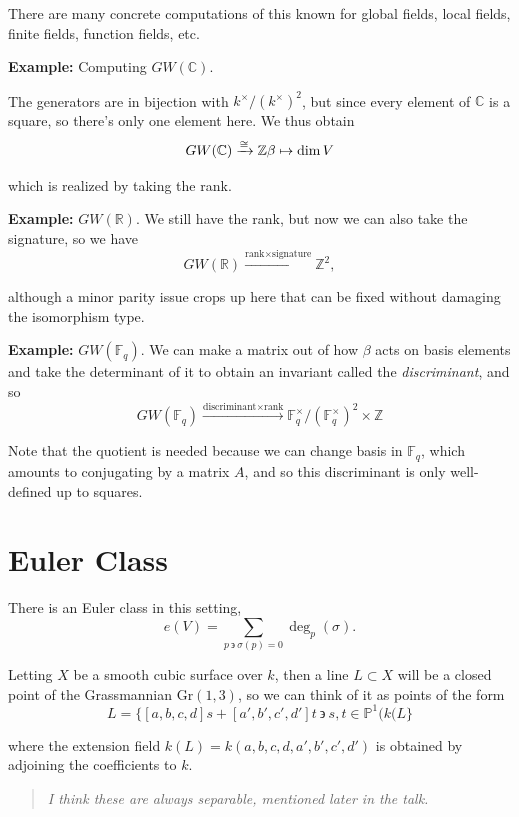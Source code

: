 \documentclass[11pt]{scrreprt}
\theoremstyle{definition}
\newcommand{\RR}[0]{{\mathbb{R}}}
\newcommand{\ZZ}[0]{{\mathbb{Z}}}
\newcommand{\CC}[0]{{\mathbb{C}}}
\newcommand{\FF}[0]{{\mathbb{F}}}
\newcommand{\PP}[0]{{\mathbb{P}}}
\newcommand{\Gr}[0]{{\text{Gr}}}
\newcommand{\suchthat}[0]{{~\backepsilon ~}}
\newcommand{\mapsvia}[1]{\xrightarrow{#1}}
\newcommand{\theset}[1]{\{{#1}\}}
\begin{document}
There are many concrete computations of this known for global fields,
local fields, finite fields, function fields, etc.

\textbf{Example:} Computing \(GW(\CC)\).

The generators are in bijection with \(k^\times/(k^\times)^2\), but
since every element of \(\CC\) is a square, so there's only one element
here. We thus obtain \[
GW(\CC) \mapsvia{\cong} \ZZ \\
\beta \mapsto \dim V
\]

which is realized by taking the rank.

\textbf{Example:} \(GW(\RR)\). We still have the rank, but now we can
also take the signature, so we have \[
GW(\RR) \mapsvia{\text{rank} \times \text{signature}} \ZZ^2,
\]

although a minor parity issue crops up here that can be fixed without
damaging the isomorphism type.

\textbf{Example:} \(GW(\FF_q)\). We can make a matrix out of how
\(\beta\) acts on basis elements and take the determinant of it to
obtain an invariant called the \emph{discriminant}, and so \[
GW(\FF_q) \mapsvia{\text{discriminant} \times \text{rank}} \FF_q^\times/(\FF_q^\times)^2 \times \ZZ
\]

Note that the quotient is needed because we can change basis in
\(\FF_q\), which amounts to conjugating by a matrix \(A\), and so this
discriminant is only well-defined up to squares.

\hypertarget{euler-class}{%
\section{Euler Class}\label{euler-class}}

There is an Euler class in this setting, \[
e(V) = \sum_{p\suchthat \sigma(p) = 0} \deg_p(\sigma).
\]

Letting \(X\) be a smooth cubic surface over \(k\), then a line
\(L\subset X\) will be a closed point of the Grassmannian \(\Gr(1,3)\),
so we can think of it as points of the form \[
L = \theset{[a,b,c,d]s + [a',b',c',d']t \suchthat s,t \in \PP^1(k(L}
\]

where the extension field \(k(L) = k(a,b,c,d,a',b',c',d')\) is obtained
by adjoining the coefficients to \(k\).

\begin{quote}\textit{
I think these are always separable, mentioned later in the talk.
}\end{quote}
\end{document}
